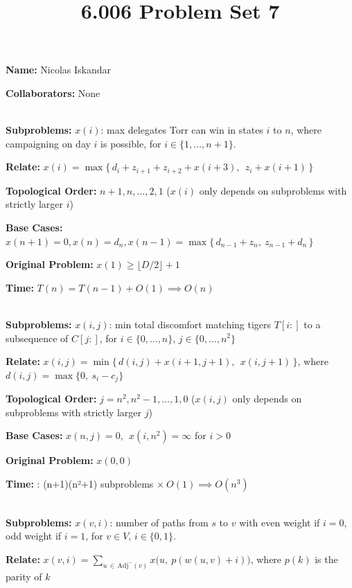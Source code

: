 \documentclass[12pt,twoside]{article}
\title{6.006 Problem Set 7}
\newcommand{\theproblemsetnum}{7}
\begin{document}
\handout{Problem Set \theproblemsetnum}

\setlength{\parindent}{0pt}
\medskip\hrulefill\medskip

{\bf Name:} Nicolas Iskandar

\medskip

{\bf Collaborators:} None

\medskip\hrulefill

\begin{problems}

\problem  %
\\
\textbf{Subproblems:} $x(i)$: max delegates Torr can win in states $i$ to $n$, where campaigning on day $i$ is possible, for $i \in \{1, \dots, n+1\}$.

\textbf{Relate:} $x(i) = \max\{\, d_i + z_{i+1} + z_{i+2} + x(i+3),\ \ z_i + x(i+1) \,\}$

\textbf{Topological Order:} $n+1, n, \dots, 2, 1$ ($x(i)$ only depends on subproblems with strictly larger $i$)

\textbf{Base Cases:} $x(n+1) = 0, x(n) = d_n, x(n-1) = \max\{\,d_{n-1}+z_n,\ z_{n-1}+d_n\,\}$

\textbf{Original Problem:} $x(1) \geq \lfloor D/2 \rfloor + 1$

\textbf{Time:} $T(n) = T(n - 1) + O(1) \implies O(n)$


\problem  %
\\
\textbf{Subproblems:} $x(i,j)$: min total discomfort matching tigers $T[i:]$ to a subsequence of $C[j:]$, for $i \in \{0,\dots,n\}$, $j \in \{0,\dots,n^2\}$

\textbf{Relate:} $x(i,j) = \min\{\, d(i,j) + x(i+1,j+1),\ \ x(i,j+1) \,\}$, where $d(i,j) = \max\{0,\ s_i - c_j\}$

\textbf{Topological Order:} $j = n^2, n^2-1, \dots, 1, 0$ ($x(i,j)$ only depends on subproblems with strictly larger $j$)

\textbf{Base Cases:} $x(n,j) = 0,\ \ x(i,n^2) = \infty$ for $i > 0$

\textbf{Original Problem:} $x(0,0)$

\textbf{Time:} : (n+1)(n²+1) subproblems $\times\ O(1) \implies O(n^3)$

\problem  %
\\
\textbf{Subproblems:} $x(v,i)$: number of paths from $s$ to $v$ with even weight if $i=0$, odd weight if $i=1$, for $v \in V$, $i \in \{0,1\}$.

\textbf{Relate:} $x(v,i) = \displaystyle\sum_{u \,\in\, \text{Adj}^-(v)} x\big(u,\ p(w(u,v)+i)\big)$, where $p(k)$ is the parity of $k$


\end{problems}
\end{document}
